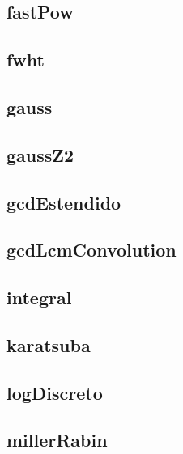 \subsection{fastPow}
\raggedbottom
\hrulefill
\subsection{fwht}
\raggedbottom
\hrulefill
\subsection{gauss}
\raggedbottom
\hrulefill
\subsection{gaussZ2}
\raggedbottom
\hrulefill
\subsection{gcdEstendido}
\raggedbottom
\hrulefill
\subsection{gcdLcmConvolution}
\raggedbottom
\hrulefill
\subsection{integral}
\raggedbottom
\hrulefill
\subsection{karatsuba}
\raggedbottom
\hrulefill
\subsection{logDiscreto}
\raggedbottom
\hrulefill
\subsection{millerRabin}
\raggedbottom
\hrulefill
